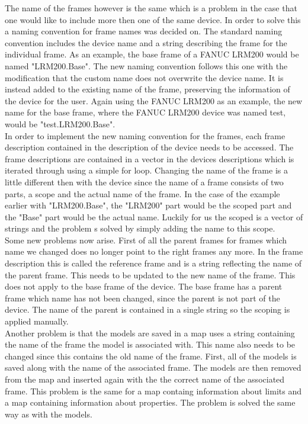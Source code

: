 The name of the frames however is the same which is a problem in the case that one would like to include more then one of the same device. In order to solve this a naming convention for frame names was decided on. The standard naming convention includes the device name and a string describing the frame for the individual frame. As an example, the base frame of a FANUC LRM200 would be named "LRM200.Base". The new naming convention follows this one with the modification that the custom name does not overwrite the device name. It is instead added to the existing name of the frame, preserving the information of the device for the user. Again using the FANUC LRM200 as an example, the new name for the base frame, where the FANUC LRM200 device was named test, would be "test.LRM200.Base".\\

In order to implement the new naming convention for the frames, each frame description contained in the description of the device needs to be accessed. The frame descriptions are contained in a vector in the devices descriptions which is iterated through using a simple for loop. Changing the name of the frame is a little different then with the device since the name of a frame consists of two parts, a scope and the actual name of the frame. In the case of the example earlier with "LRM200.Base", the "LRM200" part would be the scoped part and the "Base" part would be the actual name. Luckily for us the scoped is a vector of strings and the problem s solved by simply adding the name to this scope.\\

Some new problems now arise. First of all the parent frames for frames which name we changed does no longer point to the right frames any more. In the frame description this is called the reference frame and is a string reflecting the name of the parent frame. This needs to be updated to the new name of the frame. This does not apply to the base frame of the device. The base frame has a parent frame which name has not been changed, since the parent is not part of the device. The name of the parent is contained in a single string so the scoping is applied manually.\\

Another problem is that the models are saved in a map uses a string containing the name of the frame the model is associated with. This name also needs to be changed since this contains the old name of the frame. First, all of the models is saved along with the name of the associated frame. The models are then removed from the map and inserted again with the the correct name of the associated frame. This problem is the same for a map containg information about limits and a map containing information about properties. The problem is solved the same way as with the models.\\

